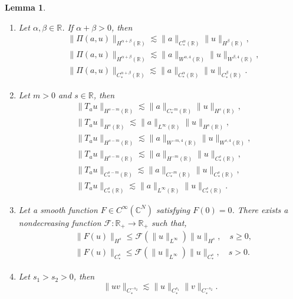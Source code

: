 \documentclass[10pt]{amsart}
\newtheorem{lemma}[theorem]{Lemma}
\theoremstyle{remark}
\theoremstyle{definition}
\numberwithin{equation}{section}
\begin{document}
\begin{lemma} \label{t:ParaProductEst}
\begin{enumerate}
\item Let $\alpha, \beta \in \mathbb{R}$. 
If $\alpha+ \beta >0$, then
\begin{align}
&\|\Pi(a, u)\|_{H^{\alpha + \beta}(\mathbb{R})} \lesssim \| a\|_{C_{*}^\alpha(\mathbb{R})} \| u\|_{H^\beta(\mathbb{R})}, \label{HCHEstimate}\\
&\|\Pi(a, u)\|_{H^{\alpha + \beta}(\mathbb{R})} \lesssim \| a\|_{W^{\alpha,4}(\mathbb{R})} \| u\|_{W^{\beta,4}(\mathbb{R})}, \label{HLLEstimate}\\
& \|\Pi(a, u)\|_{C_{*}^{\alpha + \beta}(\mathbb{R})} \lesssim \| a\|_{C_{*}^\alpha(\mathbb{R})} \| u\|_{C_{*}^\beta(\mathbb{R})}. \label{CCCEstimate}
\end{align}
\item Let $m > 0$ and $s\in \mathbb{R}$, then
\begin{align}
&\|T_{a} u \|_{H^{s-m}(\mathbb{R})} \lesssim \|a\|_{C_{*}^{-m}(\mathbb{R})} \| u \|_{H^s(\mathbb{R})} \label{HsCmStar}, \\
&\|T_{a} u \|_{H^{s}(\mathbb{R})} \lesssim \|a\|_{L^\infty(\mathbb{R})} \| u \|_{H^s(\mathbb{R})}, \label{HsLinfty}\\
&\|T_{a} u \|_{H^{s-m}(\mathbb{R})} \lesssim \|a\|_{W^{-m,4}(\mathbb{R})} \| u \|_{W^{s,4}(\mathbb{R})}, \label{HsLFour}\\
&\|T_{a} u \|_{H^{s-m}(\mathbb{R})} \lesssim \|a\|_{H^{-m}(\mathbb{R})} \| u \|_{C_{*}^s(\mathbb{R})}, \label{HsHmCStar}\\
&\|T_{a} u \|_{C_{*}^{s-m}(\mathbb{R})} \lesssim \|a\|_{C_{*}^{-m}(\mathbb{R})} \| u \|_{C_{*}^s(\mathbb{R})}, \label{CsCmStar}\\
&\|T_{a} u \|_{C_{*}^{s}(\mathbb{R})} \lesssim \|a\|_{L^\infty(\mathbb{R})} \| u \|_{C_{*}^s(\mathbb{R})}. \label{CsLInfty}
\end{align}
\item Let  a smooth function $F\in C^\infty(\mathbb{C}^N)$ satisfying $F(0) = 0$.
There exists a nondecreasing function $\mathcal{F}: \mathbb{R}_{+} \rightarrow \mathbb{R}_{+}$ such that,
\begin{align}
&\|F(u) \|_{H^s} \leq \mathcal{F}(\|u\|_{L^\infty}) \|u\|_{H^s},\quad s\geq 0,  \label{MoserOne}\\
&\|F(u) \|_{C_{*}^s} \leq \mathcal{F}(\|u\|_{L^\infty}) \|u\|_{C_{*}^s},\quad s>0. \label{MoserTwo}
\end{align}
\item Let $s_1 > s_2 > 0$, then
\begin{equation}
    \|uv\|_{C^{-s_2}_*}\lesssim \|u\|_{C^{s_1}_*} \|v\|_{C^{-s_2}_*}. \label{CNegativeAlpha}
\end{equation}
\end{enumerate}
\end{lemma}
\end{document}
